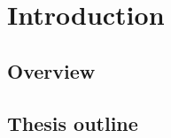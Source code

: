 \chapter{Introduction}
\label{chap:intro}

\section{Overview}
\label{sec:overview}

\section{Thesis outline}
\label{sec:outline}
